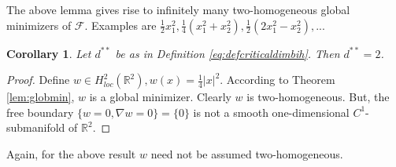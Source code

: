 \documentclass[twoside,11pt]{article}
\newtheorem{corollary}{Corollary}
\theoremstyle{definition}
\begin{document}
The above lemma gives rise to infinitely many two-homogeneous global minimizers of $\mathcal{F}$. Examples are $\frac{1}{2} x_1^2, \frac{1}{4}(x_1^2+ x_2^2) , \frac{1}{2}(2x_1^2-x_2^2),...$


\begin{corollary}\label{cor:dstarstar}
   Let $d^{**}$ be as in Definition \ref{eq:defcriticaldimbih}. Then $d^{**}  =2$. 
\end{corollary}
\begin{proof}
    Define $w \in H^2_{loc}(\mathbb{R}^2), w(x)=\frac{1}{4}|x|^2$. According to Theorem \ref{lem:globmin}, $w$ is a global minimizer. Clearly $w$ is two-homogeneous. But, the free boundary $\{ w= 0, \nabla w = 0 \} = \{0 \}$ is not a smooth one-dimensional $C^1$-submanifold of $\mathbb{R}^2$. 
\end{proof}




Again, for the above result $w$ need not be assumed two-homogeneous. 
\end{document}
